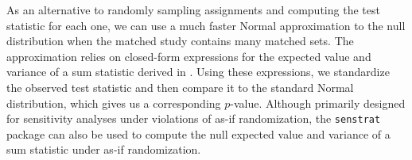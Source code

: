 \documentclass[
  12pt,
  leqno]{article}
\begin{document}
As an alternative to randomly sampling assignments and computing the
test statistic for each one, we can use a much faster Normal
approximation to the null distribution when the matched study contains
many matched sets. The approximation relies on closed-form expressions
for the expected value and variance of a sum statistic derived in
\citet{rosenbaumkrieger1990}. Using these expressions, we standardize
the observed test statistic and then compare it to the standard Normal
distribution, which gives us a corresponding \(p\)-value. Although
primarily designed for sensitivity analyses under violations of as-if
randomization, the \texttt{senstrat} package can also be used to compute
the null expected value and variance of a sum statistic under as-if
randomization.

\singlespacing
\end{document}
